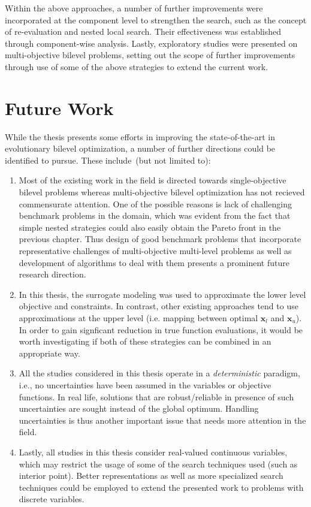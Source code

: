 Within the above approaches, a number of further improvements were incorporated at the component level to strengthen the search, such as the concept of re-evaluation and nested local search. Their effectiveness was established through component-wise analysis. Lastly, exploratory studies were presented on multi-objective bilevel problems, setting out the scope of further improvements through use of some of the above strategies to extend the current work. 

\section{Future Work}

While the thesis presents some efforts in improving the state-of-the-art in evolutionary bilevel optimization, a number of further directions could be identified to pursue. These include~(but not limited to):

\begin{enumerate}
\item Most of the existing work in the field is directed towards single-objective bilevel problems whereas multi-objective bilevel optimization has not recieved commensurate attention. One of the possible reasons is lack of challenging benchmark problems in the domain, which was evident from the fact that simple nested strategies could also easily obtain the Pareto front in the previous chapter. Thus design of good benchmark problems that incorporate representative challenges of multi-objective multi-level problems as well as development of algorithms to deal with them presents a prominent future research direction.

\item In this thesis, the surrogate modeling was used to approximate the lower level objective and constraints. In contrast, other existing approaches tend to use approximations at the upper level (i.e. mapping between optimal $\mathbf{x}_l$ and $\mathbf{x}_u$). In order to gain signficant reduction in true function evaluations, it would be worth investigating if both of these strategies can be combined in an appropriate way. 

\item All the studies considered in this thesis operate in a \emph{deterministic} paradigm, i.e., no uncertainties have been assumed in the variables or objective functions. In real life, solutions that are robust/reliable in presence of such uncertainties are sought instead of the global optimum. Handling uncertainties is thus another important issue that needs more attention in the field. 

\item Lastly, all studies in this thesis consider real-valued continuous variables, which may restrict the usage of some of the search techniques used (such as interior point). Better representations as well as more specialized search techniques could be employed to extend the presented work to problems with discrete variables. 

\end{enumerate} 


